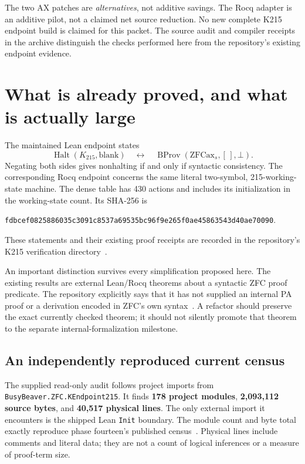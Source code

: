 \documentclass[11pt,letterpaper]{article}
\theoremstyle{definition}\newtheorem{definition}[theorem]{Definition}
\newcommand{\Halt}{\operatorname{Halt}}
\newcommand{\code}[1]{\texttt{#1}}
\begin{document}
The two AX patches are \emph{alternatives}, not additive savings. The Rocq adapter
is an additive pilot, not a claimed net source reduction. No new complete K215
endpoint build is claimed for this packet. The source audit and compiler receipts
in the archive distinguish the checks performed here from the repository's existing
endpoint evidence.

\section{What is already proved, and what is actually large}

The maintained Lean endpoint states
\[
 \Halt(K_{215},\mathrm{blank})
 \quad\longleftrightarrow\quad
 \operatorname{BProv}(\mathrm{ZFCax}_{s},[\,],\bot).
\]
Negating both sides gives nonhalting if and only if syntactic consistency. The
corresponding Rocq endpoint concerns the same literal two-symbol, 215-working-state
machine. The dense table has 430 actions and includes its initialization in the
working-state count. Its SHA-256 is
\begin{center}\small\nolinkurl{fdbcef0825886035c3091c8537a69535bc96f9e265f0ae45863543d40ae70090}.\end{center}
These statements and their existing proof receipts are recorded in the repository's
K215 verification directory~\cite{verification,endpoint}.

An important distinction survives every simplification proposed here. The existing
results are external Lean/Rocq theorems about a syntactic ZFC proof predicate. The
repository explicitly says that it has not supplied an internal PA proof or a
derivation encoded in ZFC's own syntax~\cite{verification}. A refactor should preserve
the exact currently checked theorem; it should not silently promote that theorem
to the separate internal-formalization milestone.

\subsection{An independently reproduced current census}

The supplied read-only audit follows project imports from
\code{BusyBeaver.ZFC.KEndpoint215}. It finds \textbf{178 project modules},
\textbf{2,093,112 source bytes}, and \textbf{40,517 physical lines}. The only external
import it encounters is the shipped Lean \code{Init} boundary. The module count and
byte total exactly reproduce phase fourteen's published census~\cite{phase14}.
Physical lines include comments and literal data; they are not a count of logical
inferences or a measure of proof-term size.
\end{document}

